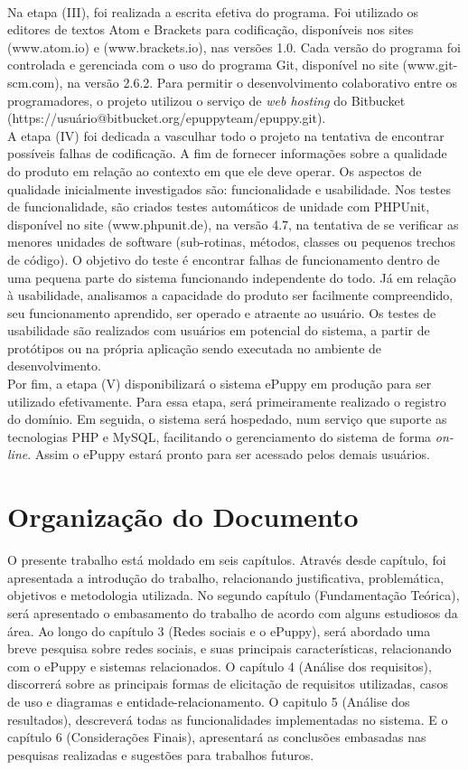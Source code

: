 \\
\indent
Na etapa (III), foi realizada a escrita efetiva do programa. Foi utilizado os editores de textos Atom e Brackets para codificação, disponíveis nos sites (www.atom.io) e (www.brackets.io), nas versões 1.0. Cada versão do programa foi controlada e gerenciada com o uso do programa Git, disponível no site (www.git-scm.com), na versão 2.6.2. Para permitir o desenvolvimento colaborativo entre os programadores, o projeto utilizou o serviço de {\it web hosting} do Bitbucket (https://usuário@bitbucket.org/epuppyteam/epuppy.git).
\\
\indent
A etapa (IV) foi dedicada a vasculhar todo o projeto na tentativa de encontrar possíveis falhas de codificação. A fim de fornecer informações sobre a qualidade do produto em relação ao contexto em que ele deve operar. Os aspectos de qualidade inicialmente investigados são: funcionalidade e usabilidade. Nos testes de funcionalidade, são criados testes automáticos de unidade com PHPUnit, disponível no site (www.phpunit.de), na versão 4.7, na tentativa de se verificar as menores unidades de software (sub-rotinas, métodos, classes ou pequenos trechos de código). O objetivo do teste é encontrar falhas de funcionamento dentro de uma pequena parte do sistema funcionando independente do todo. Já em relação à usabilidade, analisamos a capacidade do produto ser facilmente compreendido, seu funcionamento aprendido, ser operado e atraente ao usuário. Os testes de usabilidade são realizados com usuários em potencial do sistema, a partir de protótipos ou na própria aplicação sendo executada no ambiente de desenvolvimento.
\\
\indent
Por fim, a etapa (V) disponibilizará o sistema ePuppy em produção para ser utilizado efetivamente. Para essa etapa, será primeiramente realizado o registro do domínio. Em seguida, o sistema será hospedado, num serviço que suporte as tecnologias PHP e MySQL, facilitando o gerenciamento do sistema de forma {\it on-line}. Assim o ePuppy estará pronto para ser acessado pelos demais usuários.


\section{Organização do Documento}

O presente trabalho está moldado em seis capítulos. Através desde capítulo, foi apresentada a introdução do trabalho, relacionando justificativa, problemática, objetivos e metodologia utilizada. No segundo capítulo (Fundamentação Teórica), será apresentado o embasamento do trabalho de acordo com alguns estudiosos da área. Ao longo do capítulo 3 (Redes sociais e o ePuppy), será abordado uma breve pesquisa sobre redes sociais, e suas principais características, relacionando com o ePuppy e sistemas relacionados. O capítulo 4 (Análise dos requisitos), discorrerá sobre as principais formas de elicitação de requisitos utilizadas, casos de uso e diagramas e entidade-relacionamento. O capitulo 5 (Análise dos resultados), descreverá todas as funcionalidades implementadas no sistema. E o capítulo 6 (Considerações Finais), apresentará as conclusões embasadas nas pesquisas realizadas e sugestões para trabalhos futuros.
